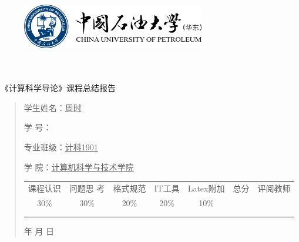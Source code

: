 \documentclass{article}
\renewcommand{\today}{\number\year 年 \number\month 月 \number\day 日}
\begin{document}
\begin{figure}
    \centering
    \includegraphics[width=8cm]{upc.png}

    \label{figupc}
\end{figure}

	\begin{center}
		\quad \\
		\quad \\
		\heiti \fontsize{45}{17} \quad \quad \quad 
		\vskip 1.5cm
		\heiti {} 《计算科学导论》课程总结报告
	\end{center}
	\vskip 2.0cm
		
	\begin{quotation}
		\doublespacing
		
        \par\setlength\parindent{7em}
		\quad 

		学生姓名：\underline{\qquad  周时 \qquad \qquad}

		学\hspace{0.61cm} 号：\underline{\qquad}
		
		专业班级：\underline{\qquad 计科1901 \qquad  }
		
        学\hspace{0.61cm} 院：\underline{计算机科学与技术学院}
		\vskip 2cm
		\centering
		\begin{table}[h]
            \centering 
            \begin{tabular}{|c|c|c|c|c|c|c|}
                \hline
                课程认识 & 问题思 考 & 格式规范  & IT工具  & Latex附加  & 总分 & 评阅教师 \\
                30\% & 30\% & 20\% & 20\% & 10\% &  &  \\
                \hline
                 & & & & & &\\
                & & & & & &\\
                \hline
            \end{tabular}
        \end{table}
		\vskip 2cm
		\today
	\end{quotation}
\end{document}
